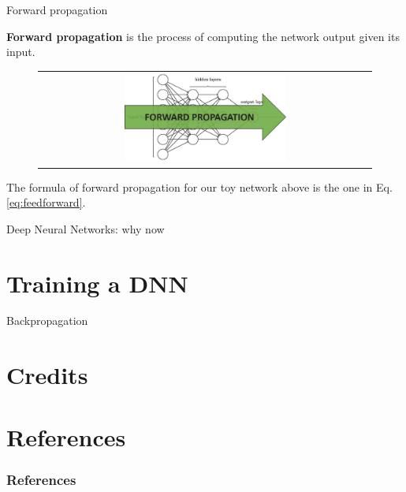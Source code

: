 \documentclass[aspectratio=169]{beamer}
\begin{document}
\begin{frame}{Forward propagation}

\textbf{Forward propagation} is the process of computing the network output given its input.
\begin{figure}
\begin{tabular}{c}
\includegraphics[width=0.5\textwidth]{img/dnn/forward_prop.jpg}
\end{tabular}
\end{figure}
The formula of forward propagation for our toy network above is the one in Eq. \ref{eq:feedforward}.

\end{frame}

\begin{frame}{Deep Neural Networks: why now}
\end{frame}


\section{Training a DNN}



\begin{frame}{Backpropagation}

\end{frame}


\section{Credits}



\section{References}

\begin{frame}[t]
\frametitle{References}


\end{frame}
\end{document}
